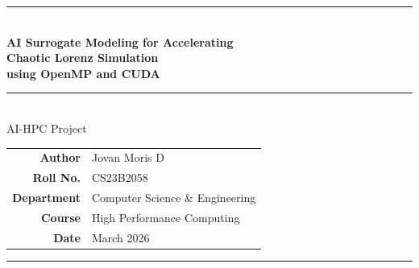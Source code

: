 \documentclass[11pt,a4paper]{article}
\newcommand{\good}[1]{{\color{OliveGreen}\textbf{#1}}}
\begin{document}
\begin{titlepage}
\centering
\vspace*{1.5cm}
{\color{accent}\rule{\linewidth}{2pt}}\\[0.4cm]
{\LARGE\bfseries\color{accent}
AI Surrogate Modeling for Accelerating\\[0.3em]
Chaotic Lorenz Simulation\\[0.3em]
using OpenMP and CUDA}\\[0.4cm]
{\color{accent}\rule{\linewidth}{1pt}}\\[1.2cm]
{\large AI-HPC Project}\\[1.8cm]

\begin{tabular}{rl}
  \textbf{Author}      & Jovan Moris D\\[4pt]
  \textbf{Roll No.}    & CS23B2058 \\[4pt]
  \textbf{Department}  & Computer Science \& Engineering \\[4pt]
  \textbf{Course}      & High Performance Computing \\[4pt]
  \textbf{Date}        & March 2026 \\
\end{tabular}

\vfill

\begin{abstract}
\noindent
This report presents a complete implementation of a hybrid HPC and AI pipeline
for accelerating the simulation of the Lorenz chaotic dynamical system. The
system architecture works in two complementary stages: \textbf{(1)} parallel
computation using OpenMP (multi-core CPU) and CUDA (GPU) to rapidly generate
trajectories up to a defined checkpoint, and \textbf{(2)} trained AI surrogate
models that take over from the checkpoint to predict the remaining trajectory
without further numerical integration. This design correctly reflects the
complementary roles of HPC and AI --- HPC accelerates the physics-based simulation
while AI replaces it beyond the predictability horizon.

The HPC component delivers the project's primary contribution: OpenMP achieves
\good{1682$\times$} speedup and CUDA achieves \good{3299$\times$} speedup over
the Python RK4 baseline. For the AI surrogate component, four models are
implemented and evaluated: MLP, improved LSTM, Temporal Convolutional Network
(TCN), and Echo State Network (ESN). TCN achieves a single-step RMSE of
\good{0.0128} and ESN achieves \good{0.0134} --- representing a \good{97.6\%}
improvement over the original baseline RMSE of 0.5256. The ESN is particularly
notable, achieving near-identical accuracy to the TCN while training in just
\good{33 seconds} compared to TCN's 159 minutes.
\end{abstract}

\vspace{0.5cm}
{\color{accent}\rule{\linewidth}{2pt}}
\end{titlepage}
\end{document}

